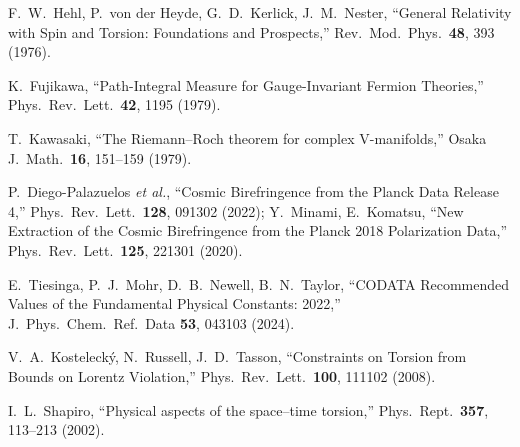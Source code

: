 \begin{enumerate}[label={[\arabic*]}]
    \item F.~W.~Hehl, P.~von der Heyde, G.~D.~Kerlick, J.~M.~Nester, 
        ``General Relativity with Spin and Torsion: Foundations and Prospects,'' 
        Rev.\ Mod.\ Phys.\ \textbf{48}, 393 (1976).
    
    \item K.~Fujikawa, ``Path-Integral Measure for Gauge-Invariant Fermion Theories,'' 
        Phys.\ Rev.\ Lett.\ \textbf{42}, 1195 (1979).
    
    \item T.~Kawasaki, ``The Riemann--Roch theorem for complex V-manifolds,'' 
        Osaka J.\ Math.\ \textbf{16}, 151--159 (1979).
    
    \item P.~Diego-Palazuelos \textit{et al.}, 
        ``Cosmic Birefringence from the Planck Data Release 4,'' 
        Phys.\ Rev.\ Lett.\ \textbf{128}, 091302 (2022);
        Y.~Minami, E.~Komatsu, 
        ``New Extraction of the Cosmic Birefringence from the Planck 2018 Polarization Data,'' 
        Phys.\ Rev.\ Lett.\ \textbf{125}, 221301 (2020).
    
    \item E.~Tiesinga, P.~J.~Mohr, D.~B.~Newell, B.~N.~Taylor, 
        ``CODATA Recommended Values of the Fundamental Physical Constants: 2022,'' 
        J.\ Phys.\ Chem.\ Ref.\ Data \textbf{53}, 043103 (2024).
    
    \item V.~A.~Kosteleck\'y, N.~Russell, J.~D.~Tasson, 
        ``Constraints on Torsion from Bounds on Lorentz Violation,'' 
        Phys.\ Rev.\ Lett.\ \textbf{100}, 111102 (2008).
    
    \item I.~L.~Shapiro, ``Physical aspects of the space--time torsion,'' 
        Phys.\ Rept.\ \textbf{357}, 113--213 (2002).
\end{enumerate}


